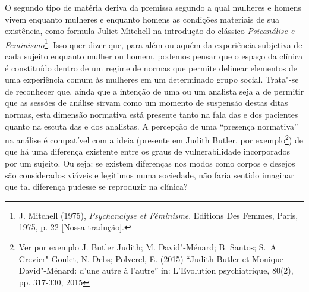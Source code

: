 O segundo tipo de matéria deriva da premissa segundo a qual mulheres e
homens vivem enquanto mulheres e enquanto homens as condições materiais
de sua existência, como formula Juliet Mitchell na introdução do
clássico \emph{Psicanálise e Feminismo}\footnote{J. Mitchell (1975),
  \emph{Psychanalyse et Féminisme}. Editions Des Femmes, Paris, 1975, p.
  22 {[}Nossa tradução{]}.}. Isso quer dizer que, para além ou aquém da
experiência subjetiva de cada sujeito enquanto mulher ou homem, podemos
pensar que o espaço da clínica é constituído dentro de um regime de
normas que permite delinear elementos de uma experiência comum às
mulheres em um determinado grupo social. Trata"-se de reconhecer que,
ainda que a intenção de uma ou um analista seja a de permitir que as
sessões de análise sirvam como um momento de suspensão destas ditas
normas, esta dimensão normativa está presente tanto na fala das e dos
pacientes quanto na escuta das e dos analistas. A percepção de uma
``presença normativa'' na análise é compatível com a ideia (presente em
Judith Butler, por exemplo\footnote{Ver por exemplo J. Butler Judith; M.
  David"-Ménard; B. Santos; S.~A Crevier"-Goulet, N. Debs; Polverel, E.
  (2015) ``Judith Butler et Monique David"-Ménard: d'une autre à
  l'autre'' in: L'Evolution psychiatrique, 80(2), pp. 317-330, 2015}) de
que há uma diferença existente entre os graus de vulnerabilidade
incorporados por um sujeito. Ou seja: se existem diferenças nos modos
como corpos e desejos são considerados viáveis e legítimos numa
sociedade, não faria sentido imaginar que tal diferença pudesse se
reproduzir na clínica?

